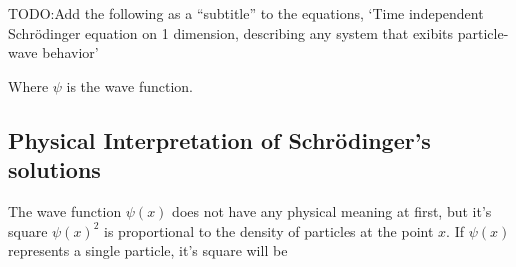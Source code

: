 \documentclass{article}[10pt]
\begin{document}
TODO:\@ Add the following as a ``subtitle'' to the equations, `Time independent
Schrödinger equation on 1 dimension, describing any system that exibits
particle-wave behavior'

Where $\psi$ is the wave function.
\subsection{Physical Interpretation of Schrödinger's solutions}

The wave function $\psi(x)$ does not have any physical meaning at first, but
it's square $\psi{(x)}^2$ is proportional to the density of particles at the point
$x$. If $\psi(x)$ represents a single particle, it's square will be
\end{document}
